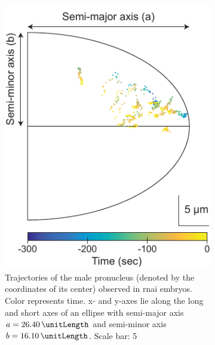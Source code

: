 \FloatBarrier
\begin{figure}
\centering
\begin{subfigure}[t]{0.4\textwidth}
    \centering
    \includegraphics[width=\textwidth]{Results/FigExpMlc4/mlc4Trajectories.pdf}
    \caption{Trajectories of the male pronucleus (denoted by the coordinates of its center) observed in  \ac{rnai} embryos. Color represents time. x- and y-axes lie along the long and short axes of an ellipse with semi-major axis $a = \SI{26.40}{\unitLength}$ and semi-minor axis $b = \SI{16.10}{\unitLength}$. Scale bar: \SI{5}{\unitLength}}
    \label{subfig:swg070Mlc4Trajectories-tracks}
\end{subfigure}
\hfill
\begin{subfigure}[t]{0.57\textwidth}
    \centering

\end{subfigure}
\end{figure}
